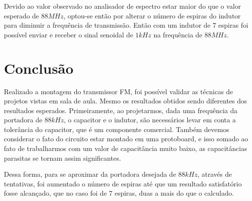 \documentclass[12pt,a4paper]{article}%
\begin{document}
Devido ao valor observado no analisador de espectro estar maior do que o valor esperado de $88MHz$, optou-se então por alterar o número de espiras do indutor para diminuir a frequência de transmissão.
Então com um indutor de 7 espiras foi possível enviar e receber o sinal senoidal de $1kHz$ na frequência de $88MHz$.

\newpage
\section{Conclusão}

Realizado a montagem do transmissor FM, foi possível validar as técnicas de projetos vistas em sala de aula. Mesmo os resultados obtidos sendo diferentes dos resultados esperados. Primeiramente, ao projetarmos, dada uma frequência da portadora de $88kHz$, o capacitor e o indutor, são necessários levar em conta a tolerância do capacitor, que é um componente comercial. Também devemos considerar o fato do circuito estar montado em uma protoboard, e isso somado ao fato de trabalharmos com um valor de capacitância muito baixo, as capacitâncias parasitas se tornam assim significantes. 

Dessa forma, para se aproximar da portadora desejada de $88kHz$, através de tentativas, foi aumentado o número de espiras até que um resultado satisfatório fosse alcançado, que no caso foi de 7 espiras, duas a mais do que o calculado.

\nocite{taufik}


\end{document}
